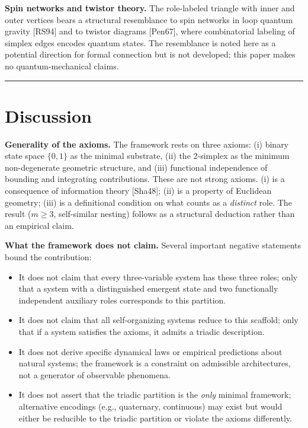 \documentclass[12pt]{article}
\providecommand{\tightlist}{%
  \setlength{\itemsep}{0pt}\setlength{\parskip}{0pt}}
\begin{document}
\textbf{Spin networks and twistor theory.} The role-labeled triangle
with inner and outer vertices bears a structural resemblance to spin
networks in loop quantum gravity {[}RS94{]} and to twistor diagrams
{[}Pen67{]}, where combinatorial labeling of simplex edges encodes
quantum states. The resemblance is noted here as a potential direction
for formal connection but is not developed; this paper makes no
quantum-mechanical claims.

\begin{center}\rule{0.5\linewidth}{0.5pt}\end{center}

\section{Discussion}\label{discussion}

\textbf{Generality of the axioms.} The framework rests on three axioms:
(i) binary state space \(\{0, 1\}\) as the minimal substrate, (ii) the
2-simplex as the minimum non-degenerate geometric structure, and (iii)
functional independence of bounding and integrating contributions. These
are not strong axioms. (i) is a consequence of information theory
{[}Sha48{]}; (ii) is a property of Euclidean geometry; (iii) is a
definitional condition on what counts as a \emph{distinct} role. The
result (\(m \ge 3\), self-similar nesting) follows as a structural
deduction rather than an empirical claim.

\textbf{What the framework does not claim.} Several important negative
statements bound the contribution:

\begin{itemize}
\tightlist
\item
  It does not claim that every three-variable system has these three
  roles; only that a system with a distinguished emergent state and two
  functionally independent auxiliary roles corresponds to this
  partition.
\item
  It does not claim that all self-organizing systems reduce to this
  scaffold; only that if a system satisfies the axioms, it admits a
  triadic description.
\item
  It does not derive specific dynamical laws or empirical predictions
  about natural systems; the framework is a constraint on admissible
  architectures, not a generator of observable phenomena.
\item
  It does not assert that the triadic partition is the \emph{only}
  minimal framework; alternative encodings (e.g., quaternary,
  continuous) may exist but would either be reducible to the triadic
  partition or violate the axioms differently.
\end{itemize}
\end{document}
